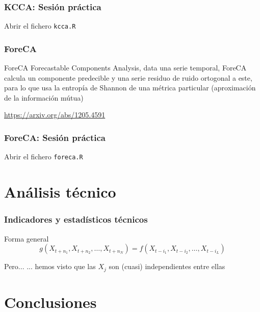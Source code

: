 \documentclass[t,9pt,pdftex]{beamer}
\begin{document}
\begin{frame}[c,containsverbatim]
\frametitle{KCCA: Sesi\'on pr\'actica}
	Abrir el fichero \texttt{kcca.R}
		
\end{frame}


\begin{frame}%
\frametitle{ForeCA}
	\begin{block}{ForeCA}
		Forecastable Components Analysis, data una serie temporal, ForeCA calcula un componente predecible y una serie residuo de ruido ortogonal a este, para lo que usa la entrop\'ia de Shannon de una m\'etrica particular (aproximaci\'on de la informaci\'on m\'utua)
	\end{block}
	
	\url{https://arxiv.org/abs/1205.4591}
		
\end{frame}


\begin{frame}[c,containsverbatim]
\frametitle{ForeCA: Sesi\'on pr\'actica}
	Abrir el fichero \texttt{foreca.R}
		
\end{frame}




\section{An\'alisis t\'ecnico}

\begin{frame}[c]
	\frametitle{Indicadores y estad\'isticos t\'ecnicos}
	
	\begin{block}{Forma general}
		$$g(X_{t+n_1}, X_{t+n_2}, \ldots, X_{t+n_N})
	 = f(X_{t-i_1}, X_{t-i_2}, \ldots, X_{t-i_L})$$		
	\end{block}
	
	\begin{exampleblock}{Pero...}
		... hemos visto que las $X_j$ son (cuasi) independientes entre ellas  
	\end{exampleblock}
	
\end{frame}



\section{Conclusiones}
\end{document}
